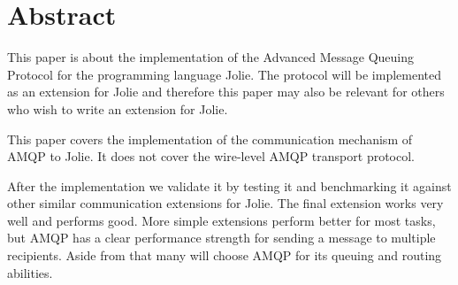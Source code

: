 \section{Abstract}
This paper is about the implementation of the Advanced Message Queuing Protocol for the programming language Jolie. The protocol will be implemented as an extension for Jolie and therefore this paper may also be relevant for others who wish to write an extension for Jolie.

This paper covers the implementation of the communication mechanism of AMQP to Jolie. It does not cover the wire-level AMQP transport protocol.

After the implementation we validate it by testing it and benchmarking it against other similar communication extensions for Jolie. The final extension works very well and performs good. More simple extensions perform better for most tasks, but AMQP has a clear performance strength for sending a message to multiple recipients. Aside from that many will choose AMQP for its queuing and routing abilities.
\newpage